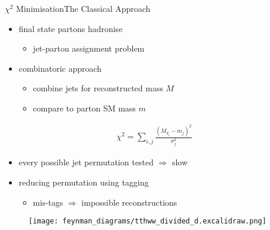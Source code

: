 \documentclass[9pt, aspectratio=169]{beamer}
\begin{document}
\begin{frame}{$\chi^2$ Minimisation}{The Classical Approach}
	\begin{minipage}{.58\textwidth}
		\begin{itemize}
			\item final state partons hadronise 
			\begin{itemize}
				\item jet-parton assignment problem
			\end{itemize}
			\item combinatoric approach
			\begin{itemize}
				\item combine jets for reconstructed mass $M$
				\item compare to parton SM mass $m$
			\end{itemize}
		\end{itemize}

		\begin{align*}
			\chi^2 = \sum_{i,j} \frac{(M_{q_i}-m_j)^2}{\sigma_j^2}
		\end{align*}

		\begin{itemize}
			\item every possible jet permutation tested $\Rightarrow$ slow
			\item reducing permutation using tagging
			\begin{itemize}
				\item mis-tags $\Rightarrow$ impossible reconstructions 
			\end{itemize} 
		\end{itemize}
	  \end{minipage}\hfill
	  \begin{minipage}{.4\textwidth}
		  \begin{figure}
			  \centering
			  \texttt{[image: feynman\_diagrams/tthww\_divided\_d.excalidraw.png]}	
		  \end{figure}
	  \end{minipage}
\end{frame}
\end{document}
